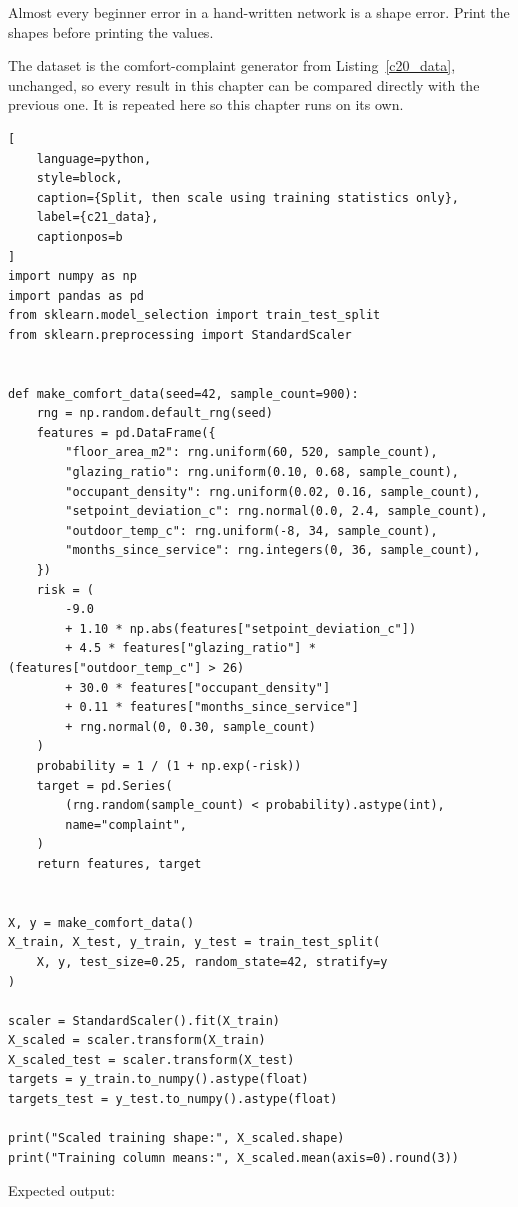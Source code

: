 Almost every beginner error in a hand-written network is a shape error. Print the
shapes before printing the values.


The dataset is the comfort-complaint generator from
Listing~\ref{c20_data}, unchanged, so every result in this chapter can be
compared directly with the previous one. It is repeated here so this chapter
runs on its own.

\begin{lstlisting}[
    language=python,
    style=block,
    caption={Split, then scale using training statistics only},
    label={c21_data},
    captionpos=b
]
import numpy as np
import pandas as pd
from sklearn.model_selection import train_test_split
from sklearn.preprocessing import StandardScaler


def make_comfort_data(seed=42, sample_count=900):
    rng = np.random.default_rng(seed)
    features = pd.DataFrame({
        "floor_area_m2": rng.uniform(60, 520, sample_count),
        "glazing_ratio": rng.uniform(0.10, 0.68, sample_count),
        "occupant_density": rng.uniform(0.02, 0.16, sample_count),
        "setpoint_deviation_c": rng.normal(0.0, 2.4, sample_count),
        "outdoor_temp_c": rng.uniform(-8, 34, sample_count),
        "months_since_service": rng.integers(0, 36, sample_count),
    })
    risk = (
        -9.0
        + 1.10 * np.abs(features["setpoint_deviation_c"])
        + 4.5 * features["glazing_ratio"] * (features["outdoor_temp_c"] > 26)
        + 30.0 * features["occupant_density"]
        + 0.11 * features["months_since_service"]
        + rng.normal(0, 0.30, sample_count)
    )
    probability = 1 / (1 + np.exp(-risk))
    target = pd.Series(
        (rng.random(sample_count) < probability).astype(int),
        name="complaint",
    )
    return features, target


X, y = make_comfort_data()
X_train, X_test, y_train, y_test = train_test_split(
    X, y, test_size=0.25, random_state=42, stratify=y
)

scaler = StandardScaler().fit(X_train)
X_scaled = scaler.transform(X_train)
X_scaled_test = scaler.transform(X_test)
targets = y_train.to_numpy().astype(float)
targets_test = y_test.to_numpy().astype(float)

print("Scaled training shape:", X_scaled.shape)
print("Training column means:", X_scaled.mean(axis=0).round(3))
\end{lstlisting}

Expected output:

